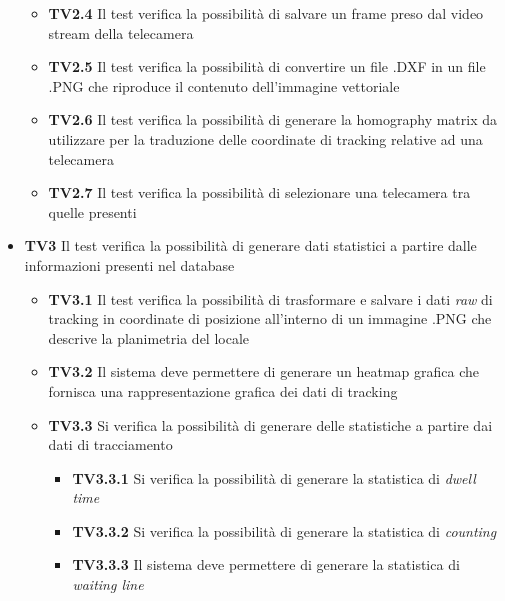 \begin{itemize}
\begin{itemize}
\begin{itemize}
\end{itemize}
\item \textbf{TV2.4} Il test verifica la possibilità di salvare un frame preso dal video stream della telecamera
\item \textbf{TV2.5} Il test verifica la possibilità di convertire un file .DXF in un file .PNG che riproduce il contenuto dell'immagine vettoriale
\item \textbf{TV2.6} Il test verifica la possibilità di generare la homography matrix da utilizzare per la traduzione delle coordinate di tracking relative ad una telecamera
\item \textbf{TV2.7} Il test verifica la possibilità di selezionare una telecamera tra quelle presenti
\end{itemize}
\item {\large \textbf{TV3}} Il test verifica la possibilità di generare dati statistici a partire dalle informazioni presenti nel database
\begin{itemize}
\item \textbf{TV3.1} Il test verifica la possibilità di trasformare e salvare i dati \textit{raw} di tracking in coordinate di posizione all'interno di un immagine .PNG che descrive la planimetria del locale

\item \textbf{TV3.2} Il sistema deve permettere di generare un heatmap grafica che fornisca una rappresentazione grafica dei dati di tracking
\item \textbf{TV3.3} Si verifica la possibilità di generare delle statistiche a partire dai dati di tracciamento

\begin{itemize}
\item \textbf{TV3.3.1} Si verifica la possibilità di generare la statistica di \textit{dwell time}
\item \textbf{TV3.3.2} Si verifica la possibilità di generare la statistica di \textit{counting}
\item \textbf{TV3.3.3} Il sistema deve permettere di generare la statistica di \textit{waiting line}
\end{itemize}
\end{itemize}
\end{itemize}
